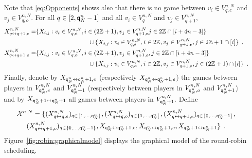 Note that \eqref{eq:Opponents} shows also that there is no game between $v_i\in V_{q,e}^{n,N}$ and $v_j\in V_{q,o}^{n,N}$. For all $q\in[2,{\mathsf{q}}^{n}_{N}-1]$ and all $v_i\in V_{q}^{n,N}$ and $v_j\in V_{q+1}^{n,N}$, 
\begin{align*}
X_{q\link q+1,e}^{n,N}=&\{X_{i,j} : v_i\in V_{q,e}^{n,N},i\in(2\bZ+1),v_j\in V_{q+1,e}^{n,N}j\in 2\bZ\cap [i+4n-3]\}\\
&\hspace{3cm}\cup\{X_{i,j} : v_i\in V_{q,e}^{n,N},i\in 2\bZ,v_j\in V_{q+1,e}^{n,N},j\in 2\bZ+1\cap [i]\}\enspace,\\
X_{q\link q+1,o}^{n,N}=&\{X_{i,j} : v_i\in V_{q,o}^{n,N},i\in(2\bZ+1),v_j\in V_{q+1,o}^{n,N},j\in2\bZ\cap [i+4n-3]\}\\
&\hspace{3cm}\cup\{X_{i,j} : v_i\in V_{q,o}^{n,N},i\in2\bZ,v_j\in V_{q+1,o}^{n,N},j\in( 2\bZ+1)\cap [i]\}\enspace.
\end{align*}
Finally, denote by $X_{{\mathsf{q}}^{n}_{N}\leftrightarrow{\mathsf{q}}^{n}_{N}+1,e}$ (respectively $X_{{\mathsf{q}}^{n}_{N}\leftrightarrow{\mathsf{q}}^{n}_{N}+1,e}$) the games between players in $V_{{\mathsf{q}}^{n}_{N},e}^{n,N}$ and $V_{{\mathsf{q}}^{n}_{N}+1}^{n,N}$ (respectively between players in $V_{{\mathsf{q}}^{n}_{N},o}^{n,N}$ and $V_{{\mathsf{q}}^{n}_{N}+1}^{n,N}$) and by $X_{{\mathsf{q}}^{n}_{N}+1\leftrightarrow{\mathsf{q}}^{n}_{N}+1}$ all games between players in $V_{{\mathsf{q}}^{n}_{N}+1}^{n,N}$. Define
\begin{multline*}
\mathcal{X}^{n,N}=\{(X_{q\leftrightarrow q,e}^{n,N})_{q\in\{1,\ldots,{\mathsf{q}}^{n}_{N}\}},(X_{q\leftrightarrow q,o}^{n,N})_{q\in\{1,\ldots,{\mathsf{q}}^{n}_{N}\}},(X_{q\leftrightarrow q+1,e}^{n,N})_{q\in\{0,\ldots,{\mathsf{q}}^{n}_{N}-1\}},\\
(X_{q \leftrightarrow q+1,o}^{n,N})_{q\in\{0,\ldots,{\mathsf{q}}^{n}_{N}-1\}},X_{{\mathsf{q}}^{n}_{N}\leftrightarrow{\mathsf{q}}^{n}_{N}+1,e},X_{{\mathsf{q}}^{n}_{N}\leftrightarrow{\mathsf{q}}^{n}_{N}+1,e},X_{{\mathsf{q}}^{n}_{N}+1\leftrightarrow{\mathsf{q}}^{n}_{N}+1}\}\enspace. 
\end{multline*}
Figure~\ref{fig:robin:graphicalmodel} displays the graphical model of the round-robin scheduling.

